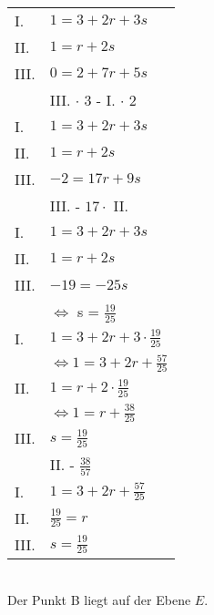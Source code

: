 \documentclass[12pt,a4paper]{report}
\begin{document}
	\begin{tabularx}{\textwidth}{|x|X|}
		\hline
		I. & $1 = 3 + 2r + 3s$ \\
		II. & $1 = r + 2s$ \\
		III. & $0 = 2 + 7r +5s$\\
		\hline
		& III. $\cdot$ 3 - I. $\cdot$ 2 \\
		\hline
		I. & $1 = 3 + 2r + 3s$ \\
		II. & $1 = r + 2s$ \\
		III. & $-2 = 17r +9s$\\
		\hline
		& III. - $17 \cdot$ II. \\
		\hline
		I. & $1 = 3 + 2r + 3s$ \\
		II. & $1 = r + 2s$ \\
		III. & $-19 = -25s$\\
		& $\Leftrightarrow$ s = $\frac{19}{25}$ \\
		\hline
		I. & $1 = 3 + 2r + 3 \cdot \frac{19}{25} $ \\
		& $\Leftrightarrow 1 = 3 + 2r + \frac{57}{25}$ \\
		II. & $1 = r + 2 \cdot \frac{19}{25} $ \\
		& $\Leftrightarrow 1 = r + \frac{38}{25}$ \\
		III. & $s = \frac{19}{25} $\\
		\hline
		& II. - $\frac{38}{57}$\\
		\hline
		I. & $1 = 3 + 2r + \frac{57}{25}$ \\
		II. & $\frac{19}{25} = r$ \\
		III. & $s = \frac{19}{25} $\\
		\hline
	\end{tabularx}
	\\[0.5cm]
	Der Punkt B liegt auf der Ebene $E$.
\end{document}

